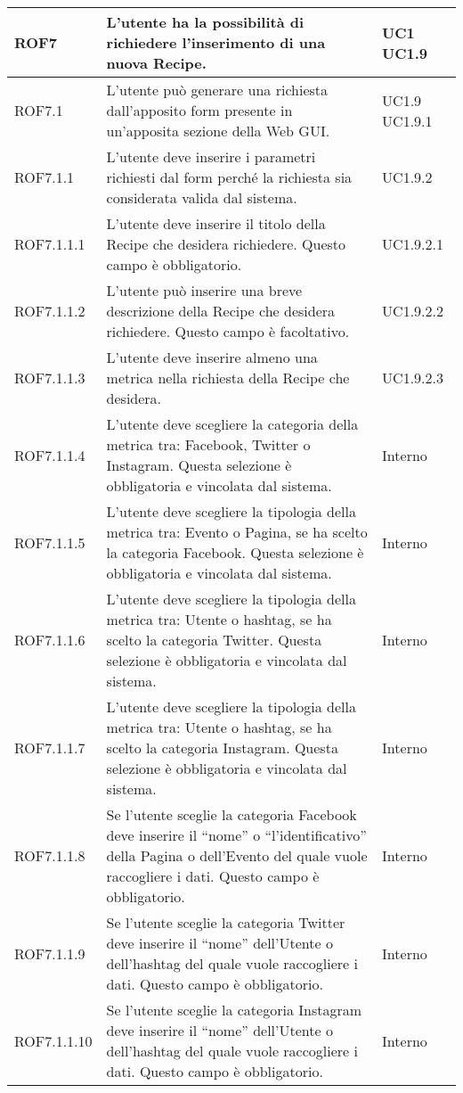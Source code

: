 \begin{center}
\begin{longtable}{| p{2.5cm} | p{8cm} | p{2cm} |}
		ROF7  & L'utente ha la possibilità di richiedere l'inserimento di una nuova Recipe. & UC1 \newline UC1.9 \\
		\hline
		ROF7.1  & L'utente può generare una richiesta dall'apposito form presente in un'apposita sezione della Web GUI. & UC1.9 \newline UC1.9.1 \\
		\hline
		ROF7.1.1 & L'utente deve inserire i parametri richiesti dal form perché la richiesta sia considerata valida dal sistema. & UC1.9.2  \\
		\hline
		ROF7.1.1.1 & L'utente deve inserire il titolo della Recipe che desidera richiedere. Questo campo è obbligatorio. & UC1.9.2.1 \\
		\hline
		ROF7.1.1.2 & L'utente può inserire una breve descrizione della Recipe che desidera richiedere. Questo campo è facoltativo. & UC1.9.2.2 \\
		\hline
		ROF7.1.1.3 & L'utente deve inserire almeno una metrica nella richiesta della Recipe che desidera. & UC1.9.2.3 \\
		\hline
		ROF7.1.1.4 & L'utente deve scegliere la categoria della metrica tra: Facebook, Twitter o Instagram. Questa selezione è obbligatoria e vincolata dal sistema. & Interno \\
		\hline
		ROF7.1.1.5 & L'utente deve scegliere la tipologia della metrica tra: Evento o Pagina, se ha scelto la categoria Facebook. Questa selezione è obbligatoria e vincolata dal sistema. & Interno \\
		\hline
		ROF7.1.1.6 & L'utente deve scegliere la tipologia della metrica tra: Utente o hashtag, se ha scelto la categoria Twitter. Questa selezione è obbligatoria e vincolata dal sistema. & Interno \\
		\hline
		ROF7.1.1.7 & L'utente deve scegliere la tipologia della metrica tra: Utente o hashtag, se ha scelto la categoria Instagram. Questa selezione è obbligatoria e vincolata dal sistema. & Interno \\
		\hline
		ROF7.1.1.8 & Se l'utente sceglie la categoria Facebook deve inserire il ``nome'' o ``l'identificativo'' della Pagina o dell'Evento del quale vuole raccogliere i dati. Questo campo è obbligatorio. & Interno \\
		\hline
		ROF7.1.1.9 & Se l'utente sceglie la categoria Twitter deve inserire il ``nome'' dell'Utente o dell'hashtag del quale vuole raccogliere i dati. Questo campo è obbligatorio. & Interno \\
		\hline
		ROF7.1.1.10 & Se l'utente sceglie la categoria Instagram deve inserire il ``nome'' dell'Utente o dell'hashtag del quale vuole raccogliere i dati. Questo campo è obbligatorio. & Interno \\

\end{longtable}
\end{center}
